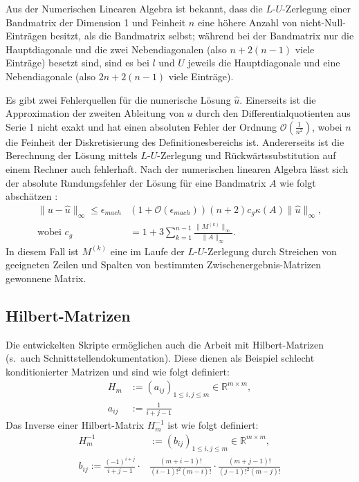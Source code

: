 \documentclass[smallheadings]{scrartcl}
\numberwithin{equation}{section}
\begin{document}
Aus der Numerischen Linearen Algebra ist bekannt, dass die $L$-$U$-Zerlegung einer Bandmatrix der Dimension 1 und Feinheit $n$ eine höhere Anzahl von nicht-Null-Einträgen besitzt, als die Bandmatrix selbst; 
während bei der Bandmatrix nur die Hauptdiagonale und die zwei Nebendiagonalen (also $n+2(n-1)$ viele Einträge) besetzt sind, sind es bei $l$ und $U$ jeweils die Hauptdiagonale und eine Nebendiagonale (also $2n+2(n-1)$ viele Einträge).

Es gibt zwei Fehlerquellen für die numerische Lösung $\hat{u}$. Einerseits ist die Approximation der zweiten Ableitung von $u$ durch den Differentialquotienten aus Serie 1 nicht exakt und hat einen absoluten Fehler der Ordnung $\mathcal{O}(\frac{1}{n^2})$, wobei $n$ die Feinheit der Diskretisierung des Definitionesbereichs ist. Andererseits ist die Berechnung der Lösung mittels $L$-$U$-Zerlegung und Rückwärtssubstitution auf einem Rechner auch fehlerhaft. Nach der numerischen linearen Algebra lässt sich der absolute Rundungsfehler der Lösung für eine Bandmatrix $A$ wie folgt abschätzen \cite{nla}:
\begin{align}
\|u-\hat{u}\|_{\infty}\le \epsilon_{mach}&(1+\mathcal{O}(\epsilon_{mach}))(n+2)c_g\kappa(A)\|\hat{u}\|_{\infty}, \\
\text{wobei } c_g&=1+3\sum_{k=1}^{n-1}\frac{\|M^{(k)}\|_{\infty}}{\|A\|_{\infty}}.
\label{eq:rundfeh}
\end{align}
In diesem Fall ist $M^{(k)}$ eine im Laufe der $L$-$U$-Zerlegung durch Streichen von geeigneten Zeilen und Spalten von bestimmten Zwischenergebnis-Matrizen gewonnene Matrix.

\subsection{Hilbert-Matrizen}
Die entwickelten Skripte ermöglichen auch die Arbeit mit Hilbert-Matrizen (s.~auch Schnittstellendokumentation). Diese dienen als Beispiel schlecht konditionierter Matrizen und sind wie folgt definiert:
\begin{align}
	H_m &:= (a_{ij})_{1\le i, j \le m} \in \mathbb{R}^{m\times m}, 	\\
	a_{ij} &:= \frac{1}{i+j-1} \label{eq:hb1}
\end{align}
Das Inverse einer Hilbert-Matrix $H_m^{-1}$ ist wie folgt definiert:
\begin{align}
	H_m^{-1}& := (b_{ij})_{1\le i, j \le m} \in \mathbb{R}^{m\times m},	\\
	b_{ij} := \frac{(-1)^{i+j}}{i+j-1}\cdot &\frac{(m+i-1)!}{(i-1)!^2(m-i)!}\cdot \frac{(m+j-1)!}{(j-1)!^2(m-j)!}
\end{align}
\end{document}
